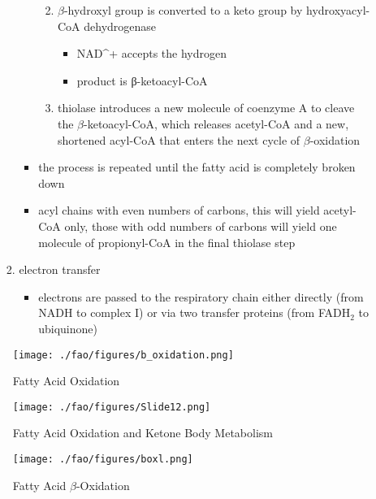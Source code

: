 \documentclass{scrartcl}
\begin{document}
\begin{enumerate}
\begin{itemize}
\begin{enumerate}
\begin{itemize}
\begin{enumerate}
\begin{itemize}
\end{itemize}
\item \(\beta\)-hydroxyl group is converted to a keto group by
hydroxyacyl-CoA dehydrogenase
\begin{itemize}
\item NAD\^{}+ accepts the hydrogen
\item product is β-ketoacyl-CoA
\end{itemize}
\item thiolase introduces a new molecule of coenzyme A to cleave
the \(\beta\)-ketoacyl-CoA, which releases acetyl-CoA and a new,
shortened acyl-CoA that enters the next cycle of
\(\beta\)-oxidation
\end{enumerate}
\item the process is repeated until the fatty acid is completely
broken down
\item acyl chains with even numbers of carbons, this will yield
acetyl-CoA only, those with odd numbers of carbons will yield
one molecule of propionyl-CoA in the final thiolase step
\end{itemize}
\item electron transfer
\begin{itemize}
\item electrons are passed to the respiratory chain either directly
(from NADH to complex I) or via two transfer proteins (from
FADH\(_{\text{2}}\) to ubiquinone)
\end{itemize}
\end{enumerate}
\end{itemize}

\begin{figure}[htbp]
\centering
\texttt{[image: ./fao/figures/b\_oxidation.png]}
\caption{\label{fig:orgf199ac7}
Fatty Acid Oxidation}
\end{figure}

\begin{figure}[htbp]
\centering
\texttt{[image: ./fao/figures/Slide12.png]}
\caption{\label{fig:org9d02d40}
Fatty Acid Oxidation and Ketone Body Metabolism}
\end{figure}


\begin{figure}[htbp]
\centering
\texttt{[image: ./fao/figures/boxl.png]}
\caption{\label{fig:orgc5751bb}
Fatty Acid \(\beta\)-Oxidation}
\end{figure}





\end{enumerate}
\end{document}
